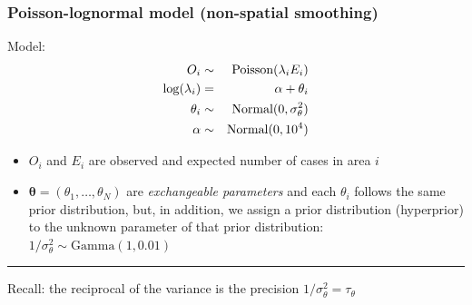 \documentclass[12pt]{beamer}
\begin{document}
\begin{frame}
    \frametitle{Poisson-lognormal model (non-spatial smoothing)}
Model:
\begin{eqnarray*}
O_i & \sim & \hbox{Poisson}(\lambda_i E_i) \\
\log(\lambda_i) & = & \alpha + \theta_i\\
\theta_i & \sim  & \hbox{Normal}(0, \sigma_{\theta}^2) \\
\alpha &\sim & \hbox{Normal}(0,10^4)\\
\end{eqnarray*}
\vspace{-10pt}
{\footnotesize
\begin{itemize}\setlength\itemsep{\fill}
\item $O_i$ and $E_i$ are observed and expected number of cases in area $i$
\item $\boldsymbol{\theta}=(\theta_1, \dots, \theta_N)$ are \emph{exchangeable parameters} and each $\theta_i$ follows the same prior distribution, but, in addition, we assign a prior distribution (hyperprior) to the unknown parameter of that prior distribution:
    $1/\sigma^2_{\theta} \sim \text{Gamma}(1, 0.01)$ %
\end{itemize}
}
\vspace{-5.5pt}
\par\noindent\rule{\textwidth}{0.4pt}
\scriptsize{Recall: the reciprocal of the variance is the precision $ 1/\sigma^2_{\theta} = \tau_{\theta} $}
\end{frame}
\end{document}
